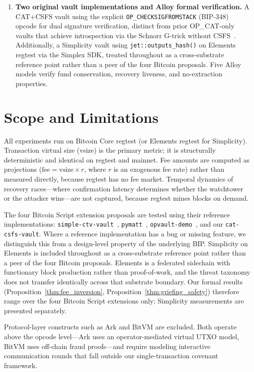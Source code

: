 \begin{enumerate}
\item \textbf{Two original vault implementations and Alloy formal verification.}
  A CAT+CSFS vault using the explicit \texttt{OP\_CHECKSIGFROMSTACK} (BIP-348) opcode
  for dual signature verification, distinct from prior OP\_CAT-only vaults that
  achieve introspection via the Schnorr G-trick without CSFS~\cite{Poe21,
  Rij24}. Additionally, a Simplicity vault using \texttt{jet::outputs\_hash()} on
  Elements regtest via the Simplex SDK, treated throughout as a cross-substrate
  reference point rather than a peer of the four Bitcoin proposals. Five Alloy
  models verify fund conservation, recovery liveness, and no-extraction properties.
\end{enumerate}

\section{Scope and Limitations} \label{se:scope}

All experiments run on Bitcoin Core regtest (or Elements regtest for Simplicity).
Transaction virtual size (vsize) is the primary metric; it is structurally deterministic
and identical on regtest and mainnet. Fee amounts are computed as projections
($\text{fee} = \text{vsize} \times r$, where $r$ is an exogenous fee rate) rather than
measured directly, because regtest has no fee market. Temporal dynamics of recovery
races---where confirmation latency determines whether the watchtower or the attacker
wins---are not captured, because regtest mines blocks on demand.

The four Bitcoin Script extension proposals are tested using their reference
implementations: \texttt{simple-ctv-vault}~\cite{BIP119}, \texttt{pymatt}~\cite{BIP443},
\texttt{opvault-demo}~\cite{BIP345}, and our \texttt{cat-csfs-vault}. Where a reference
implementation has a bug or missing feature, we distinguish this from a design-level
property of the underlying BIP. Simplicity on Elements is included throughout as a
cross-substrate reference point rather than a peer of the four Bitcoin proposals.
Elements is a federated sidechain with functionary block production rather than
proof-of-work, and the threat taxonomy does not transfer identically across that
substrate boundary. Our formal results
(Proposition~\ref{thm:fee_inversion}, Proposition~\ref{thm:griefing_safety}) therefore
range over the four Bitcoin Script extensions only; Simplicity measurements are
presented separately.

Protocol-layer constructs such as Ark and BitVM are excluded. Both operate above the
opcode level---Ark uses an operator-mediated virtual UTXO model, BitVM uses off-chain
fraud proofs---and require modeling interactive communication rounds that fall outside
our single-transaction covenant framework.

